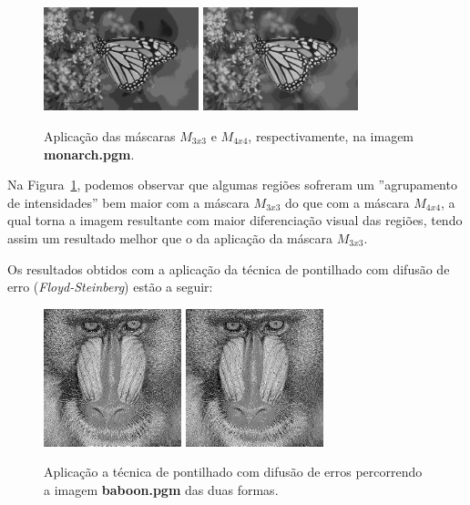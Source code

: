 \documentclass[twoside,twocolumn]{article}
\begin{document}
\begin{figure}[H]
\begin{center}
	\includegraphics[height=3cm]{figures/monarch_m33.png}
	\includegraphics[height=3cm]{figures/monarch_m44.png}
\caption{Aplicação das máscaras $M_{3x3}$ e $M_{4x4}$, respectivamente, na imagem \textbf{monarch.pgm}.} \label{monarchm33m44}
\end{center}
\end{figure}

Na Figura~\ref{monarchm33m44}, podemos observar que algumas regiões sofreram um ''agrupamento de intensidades'' bem maior com a máscara $M_{3x3}$ do que com a máscara $M_{4x4}$, a qual torna a imagem resultante com maior diferenciação visual das regiões, tendo assim um resultado melhor que o da aplicação da máscara $M_{3x3}$.

Os resultados obtidos com a aplicação da técnica de pontilhado com difusão de erro (\textit{Floyd-Steinberg}) estão a seguir:

\begin{figure}[H]
\begin{center}
	\includegraphics[height=4cm]{figures/baboon_floyd_order1.png}
	\includegraphics[height=4cm]{figures/baboon_floyd_order2.png}
\caption{Aplicação a técnica de pontilhado com difusão de erros percorrendo a imagem \textbf{baboon.pgm} das duas formas.} \label{baboonmfloyd}
\end{center}
\end{figure}
\end{document}
